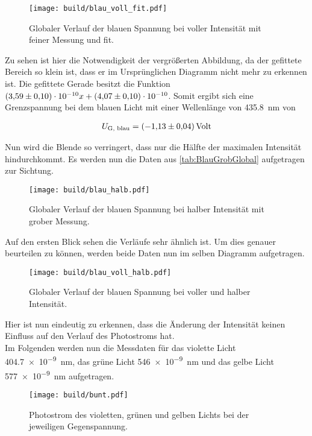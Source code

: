 \begin{figure}[H]
    \centering
    \texttt{[image: build/blau\_voll\_fit.pdf]}
    \caption{Globaler Verlauf der blauen Spannung bei voller Intensität mit feiner Messung und fit.}
\end{figure}

\noindent Zu sehen ist hier die Notwendigkeit der vergrößerten Abbildung, da der gefittete Bereich so klein ist, dass er im 
Ursprünglichen Diagramm nicht mehr zu erkennen ist. Die gefittete Gerade besitzt die Funktion $\num{3.59\pm0.1 e-10} x + \num{4.07\pm0.1e-10}$. 
Somit ergibt sich eine Grenzspannung bei dem blauen Licht mit einer Wellenlänge von \qty{435.8}{\nano\meter} von 

\begin{align}
    U_{\text{G, blau}} = \qty{-1.13\pm0.04}{Volt}
\end{align}

\noindent Nun wird die Blende so verringert, dass nur die Hälfte der maximalen Intensität hindurchkommt. Es werden nun die Daten 
aus \ref{tab:BlauGrobGlobal} aufgetragen zur Sichtung.

\begin{figure}[H]
    \centering
    \texttt{[image: build/blau\_halb.pdf]}
    \caption{Globaler Verlauf der blauen Spannung bei halber Intensität mit grober Messung.}
\end{figure}

\noindent Auf den ersten Blick sehen die Verläufe sehr ähnlich ist. Um dies genauer beurteilen zu können, werden beide Daten nun 
im selben Diagramm aufgetragen.

\begin{figure}[H]
    \centering
    \texttt{[image: build/blau\_voll\_halb.pdf]}
    \caption{Globaler Verlauf der blauen Spannung bei voller und halber Intensität.}
\end{figure}

\noindent Hier ist nun eindeutig zu erkennen, dass die Änderung der Intensität keinen Einfluss auf den Verlauf des Photostroms hat.\\
\noindent Im Folgenden werden nun die Messdaten für das violette Licht \qty{404.7e-9}{\nano\meter}, das grüne Licht \qty{546e-9}{\nano\meter} 
und das gelbe Licht \qty{577e-9}{\nano\meter} aufgetragen. 


\begin{figure}[H]
    \centering
    \texttt{[image: build/bunt.pdf]}
    \caption{Photostrom des violetten, grünen und gelben Lichts bei der jeweiligen Gegenspannung.}
\end{figure}

